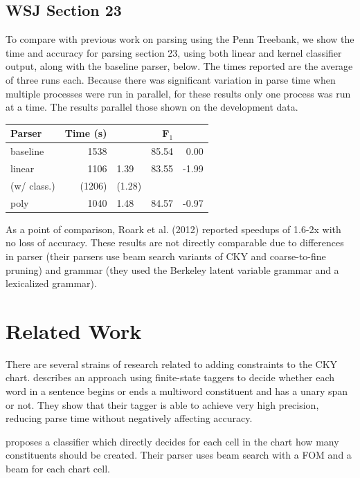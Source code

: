 \documentclass[11pt]{article}
\begin{document}
\subsection{WSJ Section 23}
\label{sec-5-5}

To compare with previous work on parsing using the Penn Treebank, we show the
time and accuracy for parsing section 23, using both linear and kernel
classifier output, along with the baseline parser, below. The times reported are
the average of three runs each. Because there was significant variation in parse
time when multiple processes were run in parallel, for these results only one
process was run at a time. The results parallel those shown on the development
data.

\begin{center}
\begin{tabular}{lrlrr}
Parser & Time (s) &  & F$_{\text{1}}$ & \\
\hline
baseline & 1538 &  & 85.54 & 0.00\\
linear & 1106 & 1.39\texttimes{} & 83.55 & -1.99\\
(w/ class.) & (1206) & (1.28\texttimes{}) &  & \\
poly & 1040 & 1.48\texttimes{} & 84.57 & -0.97\\
\end{tabular}
\end{center}

As a point of comparison, Roark et al. (2012) reported speedups of 1.6-2x with
no loss of accuracy. These results are not directly comparable due to
differences in parser (their parsers use beam search variants of CKY and
coarse-to-fine pruning) and grammar (they used the Berkeley latent variable
grammar and a lexicalized grammar).

\section{Related Work}
\label{sec-6}

There are several strains of research related to adding constraints to
the CKY chart. \cite{Roark2012} describes an approach using
finite-state taggers to decide whether each word in a sentence begins
or ends a multiword constituent and has a unary span or not. They show
that their tagger is able to achieve very high precision, reducing
parse time without negatively affecting accuracy.

\cite{Bodenstab2011} proposes a classifier which directly decides for
each cell in the chart how many constituents should be created. Their
parser uses beam search with a FOM and a beam for each chart cell.
\end{document}
